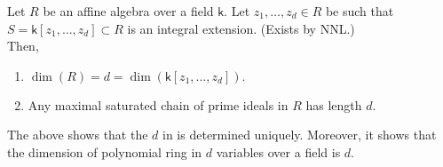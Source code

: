 \documentclass[12pt]{article}	%
\begin{document}
\begin{thm}
	Let $R$ be an affine algebra over a field $\mathsf{k}.$ Let $z_1, \ldots, z_d \in R$ be such that $S = \mathsf{k}[z_1, \ldots, z_d] \subset R$ is an integral extension. \hfill {\color{ForestGreen}(Exists by NNL.)}\\
	Then,
	\begin{enumerate}
		\item $\dim(R) = d = \dim(\mathsf{k}[z_1, \ldots, z_d]).$
		\item Any maximal saturated chain of prime ideals in $R$ has length $d.$
	\end{enumerate}
\end{thm}
\begin{rem}
	The above shows that the $d$ in  is determined uniquely. Moreover, it shows that the dimension of polynomial ring in $d$ variables over a field is $d.$
\end{rem}
\end{document}
